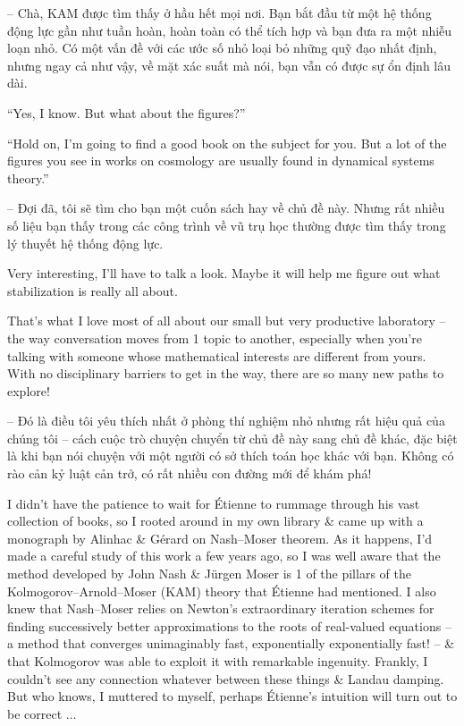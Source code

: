 \documentclass{article}
\begin{document}
\begin{enumerate}
	-- Chà, KAM được tìm thấy ở hầu hết mọi nơi. Bạn bắt đầu từ một hệ thống động lực gần như tuần hoàn, hoàn toàn có thể tích hợp và bạn đưa ra một nhiễu loạn nhỏ. Có một vấn đề với các ước số nhỏ loại bỏ những quỹ đạo nhất định, nhưng ngay cả như vậy, về mặt xác suất mà nói, bạn vẫn có được sự ổn định lâu dài.
	
	``Yes, I know. But what about the figures?''
	
	``Hold on, I'm going to find a good book on the subject for you. But a lot of the figures you see in works on cosmology are usually found in dynamical systems theory.''
	
	-- Đợi đã, tôi sẽ tìm cho bạn một cuốn sách hay về chủ đề này. Nhưng rất nhiều số liệu bạn thấy trong các công trình về vũ trụ học thường được tìm thấy trong lý thuyết hệ thống động lực.
	
	Very interesting, I'll have to talk a look. Maybe it will help me figure out what stabilization is really all about.
	
	That's what I love most of all about our small but very productive laboratory -- the way conversation moves from 1 topic to another, especially when you're talking with someone whose mathematical interests are different from yours. With no disciplinary barriers to get in the way, there are so many new paths to explore!
	
	-- Đó là điều tôi yêu thích nhất ở phòng thí nghiệm nhỏ nhưng rất hiệu quả của chúng tôi -- cách cuộc trò chuyện chuyển từ chủ đề này sang chủ đề khác, đặc biệt là khi bạn nói chuyện với một người có sở thích toán học khác với bạn. Không có rào cản kỷ luật cản trở, có rất nhiều con đường mới để khám phá!
	
	I didn't have the patience to wait for \'Etienne to rummage through his vast collection of books, so I rooted around in my own library \& came up with a monograph by {\sc Alinhac \& G\'erard} on Nash--Moser theorem. As it happens, I'd made a careful study of this work a few years ago, so I was well aware that the method developed by {\sc John Nash \& J\"urgen Moser} is 1 of the pillars of the Kolmogorov--Arnold--Moser (KAM) theory that \'Etienne had mentioned. I also knew that Nash--Moser relies on Newton's extraordinary iteration schemes for finding successively better approximations to the roots of real-valued equations -- a method that converges unimaginably fast, exponentially exponentially fast! -- \& that {\sc Kolmogorov} was able to exploit it with remarkable ingenuity. Frankly, I couldn't see any connection whatever between these things \& Landau damping. But who knows, I muttered to myself, perhaps {\sc\'Etienne}'s intuition will turn out to be correct $\ldots$
	

\end{enumerate}
\end{document}

